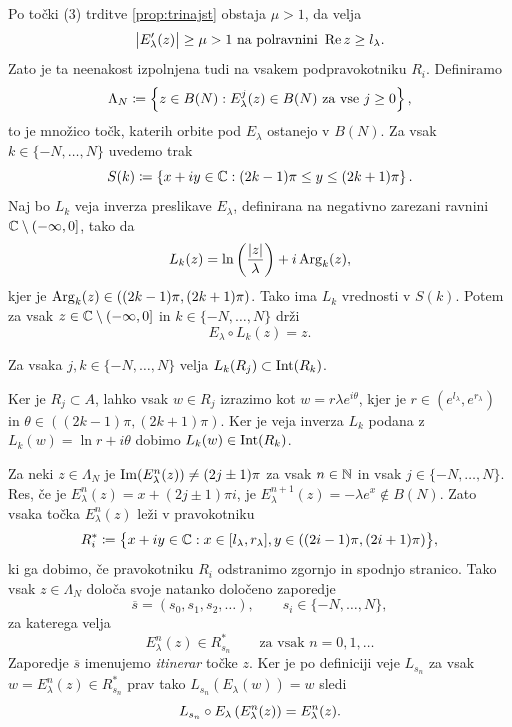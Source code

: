 Po točki (3) trditve \ref{prop:trinajst} obstaja \(\mu > 1\), da velja
\begin{equation} \label{eqn:mu-ocena}
    \bigl| E_\lambda' (z) \bigr| \geq \mu > 1 \text{ na polravnini } \operatorname{Re} z \geq l_\lambda.
\end{equation}
Zato je ta neenakost izpolnjena tudi na vsakem podpravokotniku \(R_i\). Definiramo
\[\Lambda_N \coloneq \left\{ z \in B(N) : E_\lambda^j (z) \in B (N) \text{ za vse } j \geq 0 \right\},\]
to je množico točk, katerih orbite pod \(E_\lambda\) ostanejo v \(B (N)\). Za vsak \(k \in \{ -N, \dots, N \}\) uvedemo trak
\[S (k) \coloneq \left\{ x + i y \in \mathbb C : (2k - 1) \pi \leq y \leq (2k + 1) \pi \right\}.\]
Naj bo \(L_k\) veja inverza preslikave \(E_\lambda\), definirana na negativno zarezani ravnini \(\mathbb C \setminus (- \infty, 0]\), tako da
\[L_k (z) = \ln \left( \frac{|z|}{\lambda} \right) + i \operatorname{Arg}_k (z),\]
kjer je \(\operatorname{Arg}_k (z) \in ((2k - 1) \pi, (2k + 1) \pi)\). Tako ima \(L_k\) vrednosti v \(S (k)\). Potem za vsak \(z \in \mathbb C \setminus (- \infty, 0]\) in \(k \in \{ - N, \dots, N \}\) drži
\begin{equation} \label{eqn:inverz-e}
    E_\lambda \circ L_k (z) = z.
\end{equation}

\begin{trditev} \label{prop:claim}
    Za vsaka \(j, k \in \{-N, \dots, N\}\) velja \(L_k (R_j) \subset \operatorname{Int} (R_k)\).
\end{trditev}

\begin{dokaz}
    Ker je \(R_j \subset A\), lahko vsak \(w \in R_j\) izrazimo kot \(w = r \lambda e^{i \theta}\), kjer je \(r \in (e^{l_\lambda}, e^{r_\lambda})\) in \(\theta \in ((2k - 1) \pi, (2k + 1) \pi)\). Ker je veja inverza \(L_k\) podana z \(L_k (w) = \ln r + i \theta\) dobimo \(L_k (w) \in \operatorname{Int} (R_k)\).
\end{dokaz}

Za neki \(z \in \Lambda_N\) je \(\operatorname{Im} (E_\lambda^n (z)) \neq (2j \pm 1) \pi\) za vsak \(n \in \mathbb N\) in vsak \(j \in \{ -N, \dots, N \}\). Res, če je \(E_\lambda^n (z) = x + (2j \pm 1) \pi i\), je \(E_\lambda^{n + 1} (z) = - \lambda e^x \notin B (N)\). Zato vsaka točka \(E_\lambda^n (z)\) leži v pravokotniku
\[R_i^* \coloneq \bigl\{ x + iy \in \mathbb C : x \in [l_\lambda, r_\lambda], y \in ((2i - 1) \pi, (2i + 1) \pi) \bigr\},\]
ki ga dobimo, če pravokotniku \(R_i\) odstranimo zgornjo in spodnjo stranico. Tako vsak \(z \in \Lambda_N\) določa svoje natanko določeno zaporedje
\[\overline{s} = (s_0, s_1, s_2, \dots), \qquad s_i \in \{-N, \dots, N\},\]
za katerega velja
\begin{equation} \label{eqn:itinerar}
    E_\lambda^n (z) \in R_{s_n}^* \qquad \text{za vsak } n = 0, 1, \dots
\end{equation}
Zaporedje \(\overline{s}\) imenujemo \emph{itinerar} točke \(z\). Ker je po definiciji veje \(L_{s_n}\) za vsak \(w = E_\lambda^n (z) \in R_{s_n}^*\) prav tako \(L_{s_n} (E_\lambda (w)) = w\) sledi
\begin{equation} \label{eqn:devetpet}
    L_{s_n} \circ E_\lambda \left( E_\lambda^n (z) \right) = E_\lambda^n (z).
\end{equation}

